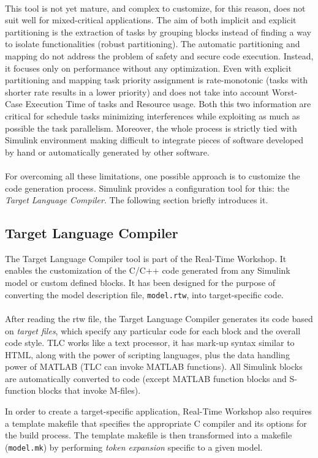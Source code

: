 \paragraph{} This tool is not yet mature, and complex to customize, for this reason, does not suit well for mixed-critical applications. The aim of both implicit and explicit partitioning is the extraction of tasks by grouping blocks instead of finding a way to isolate functionalities (robust partitioning). The automatic partitioning and mapping do not address the problem of safety and secure code execution. Instead, it focuses only on performance without any optimization. Even with explicit partitioning and mapping task priority assignment is rate-monotonic (tasks with shorter rate results in a lower priority) and does not take into account Worst-Case Execution Time of tasks and Resource usage. Both this two information are critical for schedule tasks minimizing interferences while exploiting as much as possible the task parallelism. Moreover, the whole process is strictly tied with Simulink environment making difficult to integrate pieces of software developed by hand or automatically generated by other software.

\paragraph{} For overcoming all these limitations, one possible approach is to customize the code generation process. Simulink provides a configuration tool for this: the \emph{Target Language Compiler}. The following section briefly introduces it.

\subsection{Target Language Compiler}
The Target Language Compiler tool is part of the Real-Time Workshop. It enables the customization of the C/C++ code generated from any Simulink model or custom defined blocks. It has been designed for the purpose of converting the model description file, \verb|model.rtw|, into target-specific code.

\paragraph{} After reading the rtw file, the Target Language Compiler generates its code based on \emph{target files}, which specify any particular code for each block and the overall code style. TLC works like a text processor, it has mark-up syntax similar to HTML, along with the power of scripting languages, plus the data handling power of MATLAB (TLC can invoke MATLAB functions). All Simulink blocks are automatically converted to code (except MATLAB function blocks and S-function blocks that invoke M-files). 
\par In order to create a target-specific application, Real-Time Workshop also requires a template makefile that specifies the appropriate C compiler and its options for the build process. The template makefile is then transformed into a makefile (\verb|model.mk|) by performing \emph{token expansion} specific to a given model.

